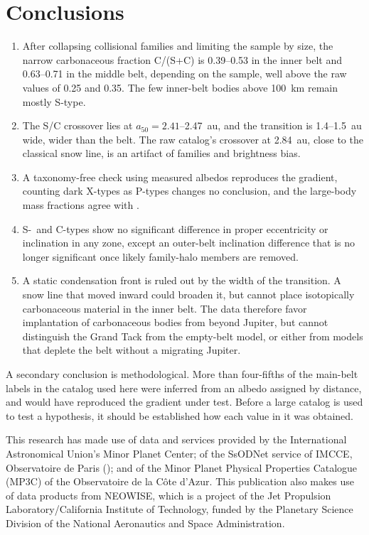 \documentclass[twocolumn]{aastex701}
\begin{document}
\section{Conclusions}\label{sec:6}
\begin{enumerate}
\item After collapsing collisional families and limiting the sample by size, the narrow carbonaceous fraction C/(S+C) is 0.39–0.53 in the inner belt and 0.63–0.71 in the middle belt, depending on the sample, well above the raw values of 0.25 and 0.35. The few inner-belt bodies above 100~km remain mostly S-type.
\item The S/C crossover lies at $a_{50} = 2.41$–2.47~au, and the transition is 1.4–1.5~au wide, wider than the belt. The raw catalog’s crossover at 2.84~au, close to the classical snow line, is an artifact of families and brightness bias.
\item A taxonomy-free check using measured albedos reproduces the gradient, counting dark X-types as P-types changes no conclusion, and the large-body mass fractions agree with \citet{demeo2014}.
\item \mbox{S-}~and C-types show no significant difference in proper eccentricity or inclination in any zone, except an outer-belt inclination difference that is no longer significant once likely family-halo members are removed.
\item A static condensation front is ruled out by the width of the transition. A snow line that moved inward could broaden it, but cannot place isotopically carbonaceous material in the inner belt. The data therefore favor implantation of carbonaceous bodies from beyond Jupiter, but cannot distinguish the Grand Tack from the empty-belt model, or either from models that deplete the belt without a migrating Jupiter.
\end{enumerate}
A secondary conclusion is methodological. More than four-fifths of the main-belt labels in the catalog used here were inferred from an albedo assigned by distance, and would have reproduced the gradient under test. Before a large catalog is used to test a hypothesis, it should be established how each value in it was obtained.

\begin{acknowledgments}
This research has made use of data and services provided by the International Astronomical Union’s Minor Planet Center; of the SsODNet service of IMCCE, Observatoire de Paris (\citealt{berthier2023}); and of the Minor Planet Physical Properties Catalogue (MP3C) of the Observatoire de la Côte d’Azur. This publication also makes use of data products from NEOWISE, which is a project of the Jet Propulsion Laboratory/California Institute of Technology, funded by the Planetary Science Division of the National Aeronautics and Space Administration.

\end{acknowledgments}
\end{document}
